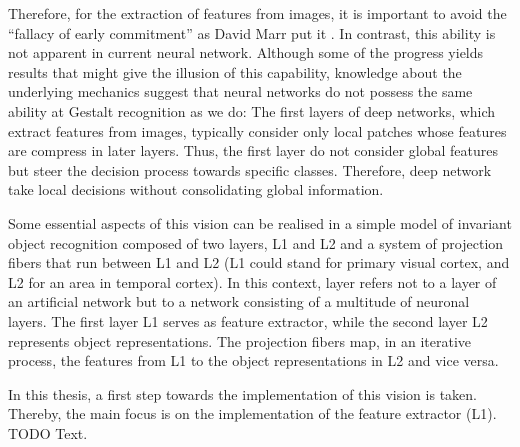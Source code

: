 Therefore, for the extraction of features from images, it is important to avoid the ``fallacy of early commitment'' as David Marr put it . In contrast, this ability is not apparent in current neural network. Although some of the progress yields results that might give the illusion of this capability, knowledge about the underlying mechanics suggest that neural networks do not possess the same ability at Gestalt recognition as we do: The first layers of deep networks, which extract features from images, typically consider only local patches whose features are compress in later layers. Thus, the first layer do not consider global features but steer the decision process towards specific classes. Therefore, deep network take local decisions without consolidating global information.

Some essential aspects of this vision can be realised in a simple model of invariant object recognition composed of two layers, L1 and L2 and a system of projection fibers that run between L1 and L2 (L1 could stand for primary visual cortex, and L2 for an area in temporal cortex).
In this context, layer refers not to a layer of an artificial network but to a network consisting of a multitude of neuronal layers.
The first layer L1 serves as feature extractor, while the second layer L2 represents object representations. The projection fibers map, in an iterative process, the features from L1 to the object representations in L2 and vice versa.

In this thesis, a first step towards the implementation of this vision is taken. Thereby, the main focus is on the implementation of the feature extractor (L1).
TODO Text.

